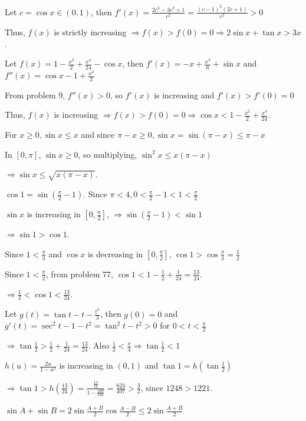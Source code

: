   Let $c = \cos x\in(0, 1)$, then $f'(x) = \frac{2c^3 - 3c^2 + 1}{c^2} = \frac{(c - 1)^2(2c + 1)}{c^2} > 0$

  Thus, $f(x)$ is strictly increasing $\Rightarrow f(x) > f(0) = 0\Rightarrow 2\sin x + \tan x > 3x$.
\item Let $f(x) = 1 - \frac{x^2}{2} + \frac{x^4}{24} - \cos x$, then $f'(x) = -x + \frac{x^3}{6} + \sin x$ and
  $f''(x) = \cos x - 1 + \frac{x^2}{2}$

  From problem 9, $f''(x) > 0$, so $f'(x)$ is increasing and $f'(x) > f'(0) = 0$

  Thus, $f(x)$ is increasing $\Rightarrow f(x) > f(0) = 0\Rightarrow \cos x < 1 - \frac{x^2}{2} +
  \frac{x^4}{24}$.
\item For $x\geq 0, \sin x\leq x$ and since $\pi - x\geq 0, \sin x = \sin(\pi - x)\leq \pi - x$

  In $[0, \pi]$, $\sin x\geq 0$, so multiplying, $\sin^2x\leq x(\pi - x)$

  $\Rightarrow \sin x\leq \sqrt{x(\pi - x)}$.
\item $\cos1 = \sin\left(\frac{\pi}{2} - 1\right)$. Since $\pi < 4, 0 < \frac{\pi}{2} - 1 < 1 <
  \frac{\pi}{2}$

  $\sin x$ is increasing in $\left[0, \frac{\pi}{2}\right]$, $\Rightarrow \sin\left(\frac{\pi}{2} - 1\right)
  < \sin1$

  $\Rightarrow \sin1 > \cos1$.
\item Since $1 < \frac{\pi}{3}$ and $\cos x$ is decreasing in $\left[0, \frac{\pi}{2}\right]$, $\cos1 >
  \cos\frac{\pi}{3} = \frac{1}{2}$

  Since $1 < \frac{\pi}{2}$, from problem 77, $\cos1 < 1 - \frac{1}{2} + \frac{1}{24} = \frac{13}{24}$.

  $\Rightarrow \frac{1}{2} < \cos1 < \frac{13}{24}$.
\item Let $g(t) = \tan t - t - \frac{t^3}{3}$, then $g(0) = 0$ and $g'(t) = \sec^2t - 1 - t^2 = \tan^2t - t^2 >
  0$ for $0 < t < \frac{\pi}{2}$

  $\Rightarrow \tan\frac{1}{2} > \frac{1}{2} + \frac{1}{24} = \frac{13}{24}$. Also $\frac{1}{2} <
  \frac{\pi}{4}\Rightarrow \tan\frac{1}{2} < 1$

  $h(u) = \frac{2u}{1 - u^2}$ is increasing in $(0, 1)$ and $\tan1 = h\left(\tan\frac{1}{2}\right)$

  $\Rightarrow \tan1 > h\left(\frac{13}{24}\right) = \frac{\frac{13}{12}}{1 - \frac{169}{576}} =
  \frac{624}{407} > \frac{3}{2}$, since $1248 > 1221$.
\item $\sin A + \sin B = 2\sin\frac{A + B}{2}\cos\frac{A - B}{2}\leq 2\sin\frac{A + B}{2}$

